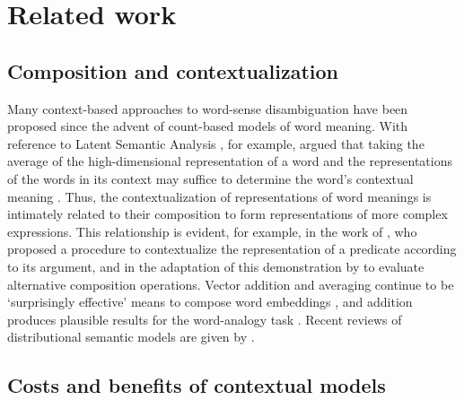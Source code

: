 \section{Related work}
\label{sec:related-work}

\subsection{Composition and contextualization}

Many context-based approaches to word-sense disambiguation have been proposed since the
advent of count-based models of word meaning.
With reference to Latent Semantic Analysis \parencite{Deerwester1990}, for example,
\citeauthor{Landauer1997} argued that taking the average of the high-dimensional
representation of a word and the representations of the words in its context may
suffice to determine the word's contextual meaning \parencite*[229-230]{Landauer1997}.
Thus, the contextualization of representations of word meanings is intimately related
to their composition to form representations of more complex expressions.
This relationship is evident, for example, in the work of \textcite{Kintsch2001}, who
proposed a procedure to contextualize the representation of a predicate according to
its argument, and in the adaptation of this demonstration by \textcite{Mitchell2008} to
evaluate alternative composition operations.
Vector addition and averaging continue to be `surprisingly effective' means to compose
word embeddings \parencite[10]{Boleda2020}, and addition produces plausible results for
the word-analogy task \parencites[9]{Mikolov2013}[7]{Mikolov2013a}.
Recent reviews of distributional semantic models are given by
\textcites{Lenci2018}{Boleda2020}.

\subsection{Costs and benefits of contextual models}

